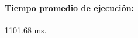 \documentclass[12pt, a4paper, titlepage]{report}
\begin{document}
	            \paragraph{Tiempo promedio de ejecución: } 1101.68 ms.\\

\end{document}

